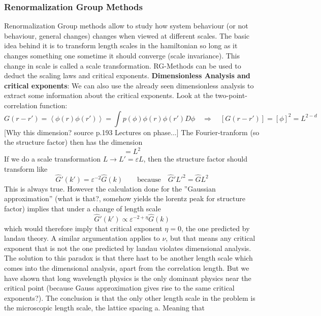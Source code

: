 	\subsubsection{Renormalization Group Methods}
	\label{withoutsecRG}
	Renormalization Group methods allow to study how system behaviour (or not behaviour, general changes) changes when viewed at different scales. The basic idea behind it is to transform length scales in the hamiltonian so long as it changes something one sometime it should converge (scale invariance). This change in scale is called a scale transformation. RG-Methods can be used to deduct the scaling laws and critical exponents.
	\textbf{Dimensionless Analysis and critical exponents}: We can also use the already seen dimensionless analysis to extract some information about the critical exponents.
	Look at the two-point-correlation function:
	\begin{equation}
		G(r - r') =	\left\langle \phi(r) \phi(r')\right\rangle = \int p(\phi) \phi(r) \phi(r') D\phi \quad \Rightarrow \quad [G(r-r')] =	[\phi]^2 =	L^{2-d}
	\end{equation}
	[Why this dimension? source p.193 Lectures on phase...]
	The Fourier-tranform (so the structure factor) then has the dimension
	\begin{equation}
		[\hat{G}(k)] =	L^2
	\end{equation}
	If we do a scale transformation $L \rightarrow L' = \varepsilon L$, then the structure factor should transform like
	\begin{equation}
		\hat{G}'(k') =	\varepsilon^{-2} \hat{G}(k) \qquad \text{because} \quad \hat{G}'L'^2 =	\hat{G}L^2
	\end{equation}
	This is always true. However the calculation done for the ''Gaussian approximation'' (what is that?, somehow yields the lorentz peak for structure factor) implies that under a change of length scale
	\begin{equation}
		\hat{G}'(k') \propto \varepsilon^{-2 + \eta} \hat{G}(k)
	\end{equation}
	which would therefore imply that critical exponent $\eta  = 0$, the one predicted by landau theory. A similar argumentation applies to $\nu$, but that means any critical exponent that is not the one predicted by landau violates dimensional analysis. The solution to this paradox is that there hast to be another length scale which comes into the dimensional analysis, apart from the correlation length. But we have shown that long wavelength physics is the only dominant physics near the critical point	(because Gauss approximation gives rise to the same critical exponents?). The conclusion is that the only other length scale in the problem is the microscopic length scale, the lattice spacing a. Meaning that
